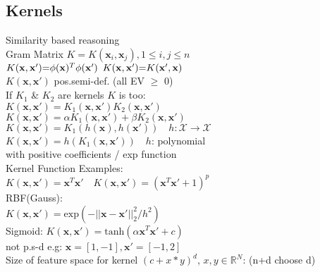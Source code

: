 \subsection*{Kernels}
Similarity based reasoning\\
Gram Matrix $K{=}K(\mathbf{x}_i, \mathbf{x}_j), 1{\leq} i,j{\leq} n$\\
$K(\mathbf{x}, \mathbf{x'}) {=} \phi(\mathbf{x})^T\phi(\mathbf{x'}) \enskip K(\mathbf{x},\mathbf{x'}){=}K(\mathbf{x'},\mathbf{x})$\\
$K(\mathbf{x},\mathbf{x'})$ pos.semi-def. (all EV $\geq$ 0)\\
If $K_1$ \& $K_2$ are kernels $K$ is too:\\
$K(\mathbf{x}, \mathbf{x'})=K_1(\mathbf{x}, \mathbf{x'})K_2(\mathbf{x}, \mathbf{x'})$\\
$K(\mathbf{x},\mathbf{x'})=\alpha K_1(\mathbf{x}, \mathbf{x'})+\beta K_2(\mathbf{x}, \mathbf{x'})$\\
$K(\mathbf{x},\mathbf{x'}){=}K_1(h(\mathbf{x}), h(\mathbf{x'}))\quad h:\mathcal{X}{\rightarrow}\mathcal{X}$\\
$K(\mathbf{x},\mathbf{x'}){=}h(K_1(\mathbf{x}, \mathbf{x'}))\quad h$: polynomial \\
with positive coefficients / exp function\\
Kernel Function Examples:\\
$K(\mathbf{x},\mathbf{x'}){=}\mathbf{x}^T\mathbf{x'}\quad K(\mathbf{x},\mathbf{x'}){=}(\mathbf{x}^T\mathbf{x'}{+}1)^p$\\
RBF(Gauss):\\
$K(\mathbf{x},\mathbf{x'}){=}\mathrm{exp}(-||\mathbf{x}{-}\mathbf{x'}||_2^2/h^2)$\\
Sigmoid: $K(\mathbf{x},\mathbf{x'}){=}\mathrm{tanh}(\alpha\mathbf{x}^T\mathbf{x'}+c)$\\
not p.s-d e.g: $\mathbf{x}{=}[1,-1], \mathbf{x'}{=}[-1,2]$ \\
Size of feature space for kernel $(c+x*y)^d$, $x,y \in \mathbb{R}^N$: (n+d choose d)